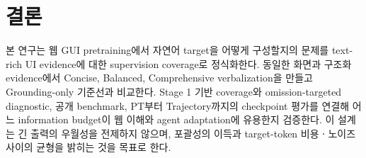 \section{결론}

본 연구는 웹 GUI pretraining에서 자연어 target을 어떻게 구성할지의
문제를 text-rich UI evidence에 대한 supervision coverage로
정식화한다. 동일한 화면과 구조화 evidence에서 Concise, Balanced,
Comprehensive verbalization을 만들고 Grounding-only 기준선과
비교한다. Stage 1 기반 coverage와 omission-targeted diagnostic,
공개 benchmark, PT부터 Trajectory까지의 checkpoint 평가를 연결해
어느 information budget이 웹 이해와 agent adaptation에 유용한지
검증한다. 이 설계는 긴 출력의 우월성을 전제하지 않으며,
포괄성의 이득과 target-token 비용ㆍ노이즈 사이의 균형을 밝히는
것을 목표로 한다.
